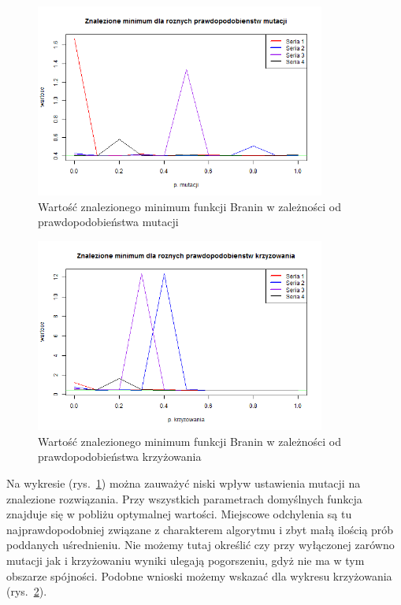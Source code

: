 \documentclass[11pt, a4paper]{article}
\newcommand{\fbi}{\leavevmode{\parindent=1em\indent}}
\begin{document}
\newpage
\begin{figure}[H]
	\centering
	\includegraphics[width=0.85\textwidth]{./assets/Branin2.png}
	\caption{Wartość znalezionego minimum funkcji Branin w zależności od prawdopodobieństwa mutacji}
	\label{fig:branin2}
\end{figure}

\begin{figure}[H]
	\centering
	\includegraphics[width=0.85\textwidth]{./assets/Branin3.png}
	\caption{Wartość znalezionego minimum funkcji Branin w zależności od prawdopodobieństwa krzyżowania}
	\label{fig:branin3}
\end{figure}

\fbi
Na wykresie (rys.~\ref{fig:branin2}) można zauważyć niski wpływ ustawienia mutacji na znalezione rozwiązania. Przy wszystkich parametrach domyślnych funkcja znajduje się w pobliżu optymalnej wartości. Miejscowe odchylenia są tu najprawdopodobniej związane z charakterem algorytmu i zbyt małą ilością prób poddanych uśrednieniu. Nie możemy tutaj określić czy przy wyłączonej zarówno mutacji jak i krzyżowaniu wyniki ulegają pogorszeniu, gdyż nie ma w tym obszarze spójności. Podobne wnioski możemy wskazać dla wykresu krzyżowania (rys.~\ref{fig:branin3}).
\end{document}
